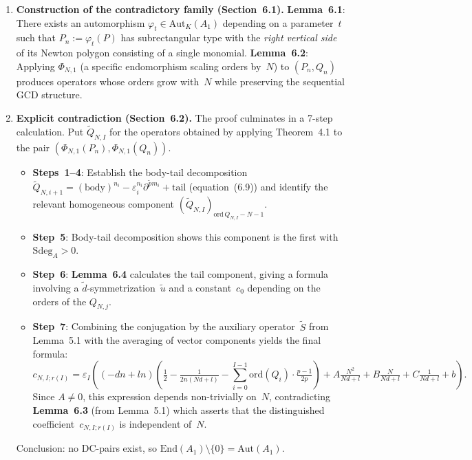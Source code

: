 \documentclass[12pt,a4paper]{article}
\theoremstyle{definition}
\begin{document}
\begin{enumerate}[label=\textbf{Step \arabic*.}, leftmargin=*]
\item \textbf{Construction of the contradictory family (Section~6.1).}
  \textbf{Lemma~6.1}: There exists an automorphism
  $\varphi_t \in \mathrm{Aut}_K(A_1)$ depending on a parameter~$t$
  such that $P_n := \varphi_t(P)$ has subrectangular type with the
  \emph{right vertical side} of its Newton polygon consisting of a
  single monomial.  \textbf{Lemma~6.2}: Applying
  $\Phi_{N,1}$ (a specific endomorphism scaling orders by~$N$) to
  $(P_n, Q_n)$ produces operators whose orders grow with~$N$ while
  preserving the sequential GCD structure.

\item \textbf{Explicit contradiction (Section~6.2).}
  The proof culminates in a 7-step calculation.  Put
  $\widetilde{Q}_{N,I}$ for the operators obtained by applying
  Theorem~4.1 to the pair $(\Phi_{N,1}(P_n), \Phi_{N,1}(Q_n))$.
  \begin{itemize}
  \item \textbf{Steps~1--4}: Establish the body-tail decomposition
    $\widetilde{Q}_{N,i+1} = (\text{body})^{n_i} -
    \varepsilon_i^{n_i}\partial^{\tilde{p}m_i} + \text{tail}$
    (equation~(6.9)) and identify the relevant homogeneous component
    $(\widetilde{Q}_{N,I})_{\mathrm{ord}\,Q_{N,I}-N-1}$.
  \item \textbf{Step~5}: Body-tail decomposition shows this component
    is the first with $\mathrm{Sdeg}_A > 0$.
  \item \textbf{Step~6}: \textbf{Lemma~6.4} calculates the tail
    component, giving a formula involving a
    $\widetilde{d}$-symmetrization~$\tilde{u}$ and a constant~$c_0$
    depending on the orders of the $Q_{N,j}$.
  \item \textbf{Step~7}: Combining the conjugation by the auxiliary
    operator~$\widetilde{S}$ from Lemma~5.1 with the averaging of vector
    components yields the final formula:
    \begin{equation}\label{eq:zheglov-contradiction}
    c_{N,I;r(I)} = \varepsilon_I\!\left((-dn+ln)\!\left(\tfrac{1}{2}
    - \tfrac{1}{2n(Nd+l)} - \textstyle\sum_{i=0}^{I-1}
    \mathrm{ord}(Q_i) \cdot \tfrac{p-1}{2p}\right)
    + A\tfrac{N^2}{Nd+l} + B\tfrac{N}{Nd+l}
    + C\tfrac{1}{Nd+l} + b\right).
    \end{equation}
    Since $A \neq 0$, this expression depends non-trivially on~$N$,
    contradicting \textbf{Lemma~6.3} (from Lemma~5.1) which asserts
    that the distinguished coefficient~$c_{N,I;r(I)}$ is independent
    of~$N$.
  \end{itemize}
  Conclusion: no DC-pairs exist, so
  $\mathrm{End}(A_1)\!\setminus\!\{0\} = \mathrm{Aut}(A_1)$.
\end{enumerate}
\end{document}
